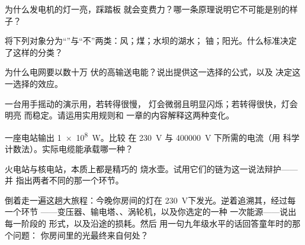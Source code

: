 \begin{exercise}[$\star$]\label{exo:g9:alternator:6}
为什么发电机的灯一亮，踩踏板
就会变费力？哪一条原理说明它不可能是别的样子？
\end{exercise}

\begin{exercise}[$\star$]\label{exo:g9:alternator:7}
将下列对象分为“”与“不”两类：风；煤；水坝的湖水；
铀；阳光。什么标准决定了这样的分类？
\end{exercise}

\begin{exercise}[$\star$]\label{exo:g9:alternator:8}
为什么电网要以数十万
伏的高输送电能？说出提供这一选择的公式，以及
决定这一选择的效应。
\end{exercise}

\begin{exercise}[$\star\star$]\label{exo:g9:alternator:9}
一台用手摇动的演示用，若转得很慢，
灯会微弱且明显闪烁；若转得很快，灯会明亮
而稳定。请运用实用规则和
一章的内容解释这两种变化。
\end{exercise}

\begin{exercise}[$\star\star$]\label{exo:g9:alternator:10}
一座电站输出 \qty{1e8}{W}。比较
在 \qty{230}{V} 与 \qty{400000}{V} 下所需的电流（用
科学计数法）。实际电缆能承载哪一种？
\end{exercise}

\begin{exercise}[$\star\star$]\label{exo:g9:alternator:11}
火电站与核电站，本质上都是精巧的
烧水壶。试用它们的链为这一说法辩护——并
指出两者不同的那一个环节。
\end{exercise}

\begin{exercise}[$\star\star\star$]\label{exo:g9:alternator:12}
倒着走一遍这趟大旅程：今晚你房间的灯在
\qty{230}{V}下发光。逆着追溯其，经过每一个环节
——变压器、输电塔、、涡轮机，以及你选定的一种
一次能源——说出每一阶段的
形式，以及沿途的损耗。然后
用一句九年级水平的话回答童年时的那个问题：
你房间里的光最终来自何处？
\end{exercise}

